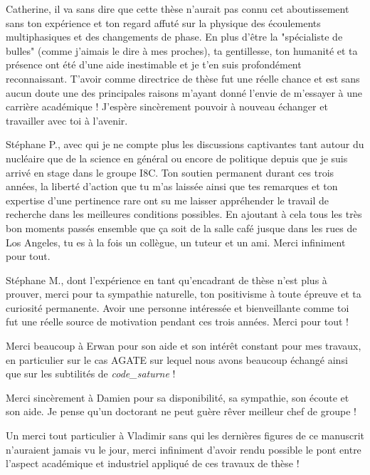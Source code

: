\npar
Catherine, il va sans dire que cette thèse n'aurait pas connu cet aboutissement sans ton expérience et ton regard affuté sur la physique des écoulements multiphasiques et des changements de phase. En plus d'être la "spécialiste de bulles" (comme j'aimais le dire à mes proches), ta gentillesse, ton humanité et ta présence ont été d'une aide inestimable et je t'en suis profondément reconnaissant. T'avoir comme directrice de thèse fut une réelle chance et est sans aucun doute une des principales raisons m'ayant donné l'envie de m'essayer à une carrière académique ! J'espère sincèrement pouvoir à nouveau échanger et travailler avec toi à l'avenir.

\npar

Stéphane P., avec qui je ne compte plus les discussions captivantes tant autour du nucléaire que de la science en général ou encore de politique depuis que je suis arrivé en stage dans le groupe I8C.  Ton soutien permanent durant ces trois années, la liberté d'action que tu m'as laissée ainsi que tes remarques et ton expertise d'une pertinence rare ont su me laisser appréhender le travail de recherche dans les meilleures conditions possibles. En ajoutant à cela tous les très bon moments passés ensemble que ça soit de la salle café jusque dans les rues de Los Angeles, tu es à la fois un collègue, un tuteur et un ami. Merci infiniment pour tout.

\npar

Stéphane M., dont l'expérience en tant qu'encadrant de thèse n'est plus à prouver, merci pour ta sympathie naturelle, ton positivisme à toute épreuve et ta curiosité permanente. Avoir une personne intéressée et bienveillante comme toi fut une réelle source de motivation pendant ces trois années. Merci pour tout !

\npar

Merci beaucoup à Erwan pour son aide et son intérêt constant pour mes travaux, en particulier sur le cas AGATE sur lequel nous avons beaucoup échangé ainsi que sur les subtilités de \textit{code\_saturne} !

\npar

Merci sincèrement à Damien pour sa disponibilité, sa sympathie, son écoute et son aide. Je pense qu'un doctorant ne peut guère rêver meilleur chef de groupe !

\npar

Un merci tout particulier à Vladimir sans qui les dernières figures de ce manuscrit n'auraient jamais vu le jour, merci infiniment d'avoir rendu possible le pont entre l'aspect académique et industriel appliqué de ces travaux de thèse !

